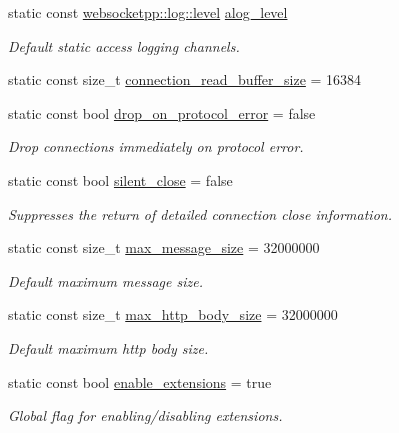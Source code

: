 \begin{DoxyCompactItemize}
static const \hyperlink{namespacewebsocketpp_1_1log_a12d4d17939f102db8c9183d400a41960}{websocketpp\+::log\+::level} \hyperlink{structwebsocketpp_1_1config_1_1core__client_a286f74bd1d4f4a7c363866ef92284992}{alog\+\_\+level}
\begin{DoxyCompactList}\small\item\em Default static access logging channels. \end{DoxyCompactList}\item 
static const size\+\_\+t \hyperlink{structwebsocketpp_1_1config_1_1core__client_a74305a56f9b85b51caa9efce0de1766e}{connection\+\_\+read\+\_\+buffer\+\_\+size} = 16384
\item 
static const bool \hyperlink{structwebsocketpp_1_1config_1_1core__client_aa43f6d2b983e0d8feb5e0bc1d9ad1be9}{drop\+\_\+on\+\_\+protocol\+\_\+error} = false
\begin{DoxyCompactList}\small\item\em Drop connections immediately on protocol error. \end{DoxyCompactList}\item 
static const bool \hyperlink{structwebsocketpp_1_1config_1_1core__client_affc0279e7717d68fbe5d2bb874f8d4d1}{silent\+\_\+close} = false
\begin{DoxyCompactList}\small\item\em Suppresses the return of detailed connection close information. \end{DoxyCompactList}\item 
static const size\+\_\+t \hyperlink{structwebsocketpp_1_1config_1_1core__client_a84c86d78867a89e10d24866deb931807}{max\+\_\+message\+\_\+size} = 32000000
\begin{DoxyCompactList}\small\item\em Default maximum message size. \end{DoxyCompactList}\item 
static const size\+\_\+t \hyperlink{structwebsocketpp_1_1config_1_1core__client_a4b68db9b245ec097555f7e99842d96b3}{max\+\_\+http\+\_\+body\+\_\+size} = 32000000
\begin{DoxyCompactList}\small\item\em Default maximum http body size. \end{DoxyCompactList}\item 
static const bool \hyperlink{structwebsocketpp_1_1config_1_1core__client_a21b1a53d292be873c1fffa7222cb3804}{enable\+\_\+extensions} = true
\begin{DoxyCompactList}\small\item\em Global flag for enabling/disabling extensions. \end{DoxyCompactList}\end{DoxyCompactItemize}


